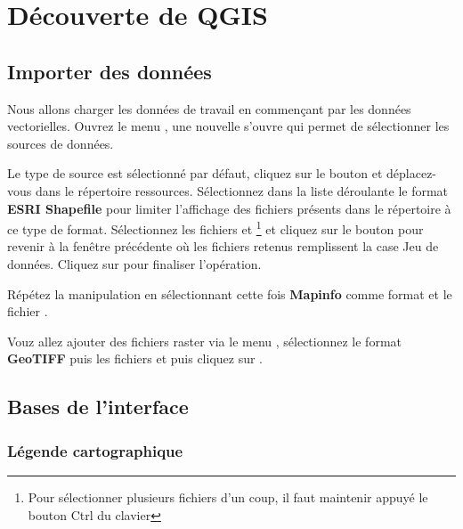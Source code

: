 
\chapter{Découverte de QGIS}\label{sec:qgis_start}

\section{Importer des données}\label{sec:import}

Nous allons charger les données de travail en commençant par les données vectorielles. Ouvrez le menu  \arrow {}, une nouvelle s'ouvre qui permet de sélectionner les sources de données. 

Le type de source  est sélectionné par défaut, cliquez sur le bouton  et déplacez-vous dans le répertoire ressources. Sélectionnez dans la liste déroulante le format \textbf{ESRI Shapefile} pour limiter l'affichage des fichiers présents dans le répertoire à ce type de format. Sélectionnez les fichiers  et  \footnote{Pour sélectionner plusieurs fichiers d'un coup, il faut maintenir appuyé le bouton Ctrl du clavier} et cliquez sur le bouton  pour revenir à la fenêtre précédente où les fichiers retenus remplissent la case Jeu de données. Cliquez sur  pour finaliser l'opération.

Répétez la manipulation en sélectionnant cette fois \textbf{Mapinfo} comme format et le fichier .

Vouz allez ajouter des fichiers raster via le menu  \arrow {}, sélectionnez le format \textbf{GeoTIFF} puis les fichiers  et  puis cliquez sur .
        
\section{Bases de l'interface}\label{sec:ui_basic} 

\subsection{Légende cartographique}\label{ui_legend}

